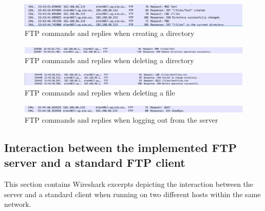 \documentclass[10pt,twocolumn]{witseiepaper}
\begin{document}
\begin{appendix}
\begin{figure}[h]
	\centering
	\includegraphics[width=1\textwidth]{makeDirectoryWits.png}
	\caption{FTP commands and replies when creating a directory}
	\raggedright
	\label{fig:makeDirectoryWits}	
\end{figure}

\begin{figure}[h]
	\centering
	\includegraphics[width=1\textwidth]{deleteDirWits.png}
	\caption{FTP commands and replies when deleting a directory}
	\raggedright
	\label{fig:deleteDirWits}	
\end{figure}

\begin{figure}[h]
	\centering
	\includegraphics[width=1\textwidth]{deleteFileWits.png}
	\caption{FTP commands and replies when deleting a file}
	\raggedright
	\label{fig:deleteFileWits}	
\end{figure}

\begin{figure}[h]
	\centering
	\includegraphics[width=1\textwidth]{logoutWits.png}
	\caption{FTP commands and replies when logging out from the server}
	\raggedright
	\label{fig:logoutWits}	
\end{figure}

\subsection{Interaction between the implemented FTP server and a standard FTP client}
This section contains Wireshark excerpts depicting the interaction between the server and a standard client when running on two different hosts within the same network.

\end{appendix}
\end{document}
